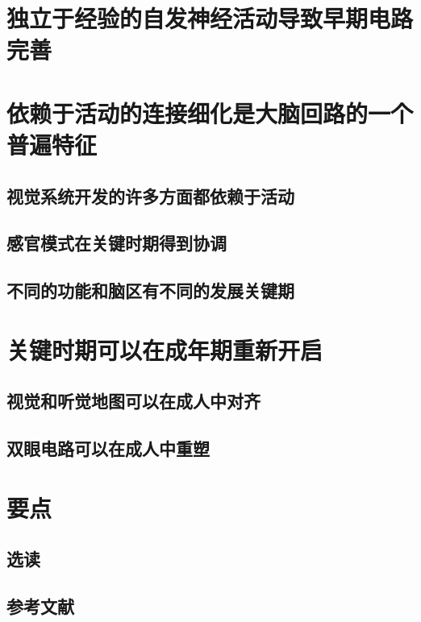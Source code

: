 \section{独立于经验的自发神经活动导致早期电路完善}

\section{依赖于活动的连接细化是大脑回路的一个普遍特征}
\subsection{视觉系统开发的许多方面都依赖于活动}
\subsection{感官模式在关键时期得到协调}
\subsection{不同的功能和脑区有不同的发展关键期}

\section{关键时期可以在成年期重新开启}
\subsection{视觉和听觉地图可以在成人中对齐}
\subsection{双眼电路可以在成人中重塑}

\section{要点}
\subsection{选读}
\subsection{参考文献}
